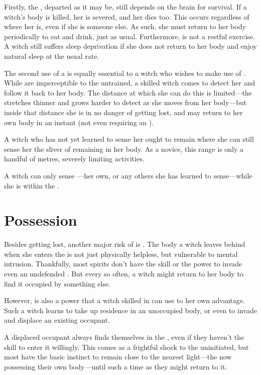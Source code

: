 Firstly, the {\mind}, departed as it may be, still depends on the brain for survival.
If a witch's body is killed, her {\lifeline} is severed, and her {\mind} dies too.
This occurs regardless of where her {\mind} is, even if she is {\possessing} someone else.
As such, she must return to her body periodically to eat and drink, just as usual.
Furthermore,  is not a restful exercise.
A witch still suffers sleep deprivation if she does not return to her body and enjoy natural sleep at the usual rate.

The second use of a {\lifeline} is equally essential to a witch who wishes to make use of .
While {\lifelines} are imperceptible to the untrained, a skilled witch comes to detect her {\lifeline} and follow it back to her body.
The distance at which she can do this is limited---the {\lifeline} stretches thinner and grows harder to detect as she moves from her body---but inside that distance she is in no danger of getting lost, and may return to her own body in an instant (not even requiring an {\action}).

A witch who has not yet learned to sense her {\lifeline} ought to remain where she can still sense her the sliver of {\mind} remaining in her body.
As a novice, this range is only a handful of metres, severely limiting activities.

A witch can only sense {\lifelines}---her own, or any others she has learned to sense---while she is within the {\mentalrealm}.

\section{Possession}

Besides getting lost, another major risk of  is {\possession}.
The body a witch leaves behind when she enters the {\mentalrealm} is not just physically helpless, but vulnerable to mental intrusion.
Thankfully, most spirits don't have the skill or the power to invade even an undefended {\mind}.
But every so often, a witch might return to her body to find it occupied by something else.

However, {\possession} is also a power that a witch skilled in  can use to her own advantage.
Such a witch learns to take up residence in an unoccupied body, or even to invade and displace an existing occupant.

A displaced occupant always finds themselves in the {\mentalrealm}, even if they haven't the skill to enter it willingly.
This comes as a frightful shock to the uninitiated, but most have the basic instinct to remain close to the nearest light---the {\mind} now possessing their own body---until such a time as they might return to it.

